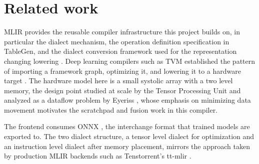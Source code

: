 \section{Related work}

MLIR provides the reusable compiler infrastructure this project builds on, in
particular the dialect mechanism, the operation definition specification in
TableGen, and the dialect conversion framework used for the representation
changing lowering \cite{mlir2021}. Deep learning compilers such as TVM established
the pattern of importing a framework graph, optimizing it, and lowering it to a
hardware target \cite{tvm2018}. The hardware model here is a small systolic array
with a two level memory, the design point studied at scale by the Tensor
Processing Unit \cite{tpu2017} and analyzed as a dataflow problem by Eyeriss
\cite{eyeriss2016}, whose emphasis on minimizing data movement motivates the
scratchpad and fusion work in this compiler.

The frontend consumes ONNX \cite{onnx}, the interchange format that trained models
are exported to. The two dialect structure, a tensor level dialect for
optimization and an instruction level dialect after memory placement, mirrors the
approach taken by production MLIR backends such as Tenstorrent's tt-mlir
\cite{ttmlir}.
